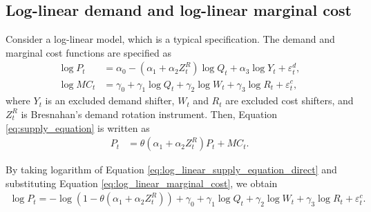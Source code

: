 \documentclass[11pt, a4paper]{article}
\begin{document}
\subsection{Log-linear demand and log-linear marginal cost}
Consider a log-linear model, which is a typical specification.
The demand and marginal cost functions are specified as
\begin{align}
    \log P_{t} &= \alpha_0 - (\alpha_1 + \alpha_2 Z^{R}_{t}) \log Q_t + \alpha_3 \log Y_t + \varepsilon^{d}_{t},\label{eq:log_linear_demand}\\
    \log MC_t &= \gamma_0 + \gamma_1 \log Q_t +  \gamma_2 \log W_{t} + \gamma_3 \log R_t + \varepsilon^{c}_{t},\label{eq:log_linear_marginal_cost}
\end{align}
where $Y_{t}$ is an excluded demand shifter, $W_t$ and $R_t$ are excluded cost shifters, and $Z_t^R$ is Bresnahan's demand rotation instrument.
Then, Equation \eqref{eq:supply_equation} is written as
\begin{align}
    P_t &= \theta (\alpha_1 + \alpha_2 Z^{R}_{t}) P_t + MC_t.\label{eq:log_linear_supply_equation_direct}
\end{align}

By taking logarithm of Equation \eqref{eq:log_linear_supply_equation_direct} and substituting Equation \eqref{eq:log_linear_marginal_cost}, we obtain
\begin{align}
    \log P_t = - \log(1 - \theta(\alpha_1 + \alpha_2 Z^{R}_{t})) + \gamma_0 + \gamma_1 \log Q_t +  \gamma_2 \log W_{t} + \gamma_3 \log R_t + \varepsilon^{c}_{t}. \label{eq:log_linear_supply_equation}
\end{align}

\end{document}
